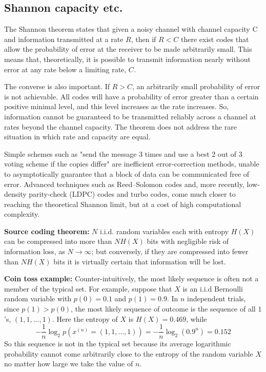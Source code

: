 \documentclass[12pt]{article}
\begin{document}
\subsection{Shannon capacity etc.}
\par The Shannon theorem states that given a noisy channel with channel capacity C and information transmitted at a rate $R$, then if $R<C$ there exist codes that allow the probability of error at the receiver to be made arbitrarily small. This means that, theoretically, it is possible to transmit information nearly without error at any rate below a limiting rate, $C$.
\par The converse is also important. If $R>C$, an arbitrarily small probability of error is not achievable. All codes will have a probability of error greater than a certain positive minimal level, and this level increases as the rate increases. So, information cannot be guaranteed to be transmitted reliably across a channel at rates beyond the channel capacity. The theorem does not address the rare situation in which rate and capacity are equal.
\par Simple schemes such as "send the message 3 times and use a best 2 out of 3 voting scheme if the copies differ" are inefficient error-correction methods, unable to asymptotically guarantee that a block of data can be communicated free of error. Advanced techniques such as Reed–Solomon codes and, more recently, low-density parity-check (LDPC) codes and turbo codes, come much closer to reaching the theoretical Shannon limit, but at a cost of high computational complexity.
\par \textbf{Source coding theorem:} $N$ i.i.d. random variables each with entropy $H(X)$ can be compressed into more than $NH(X)$ bits with negligible risk of information loss, as $N\rightarrow\infty$; but conversely, if they are compressed into fewer than $NH(X)$ bits it is virtually certain that information will be lost.
\par \textbf{Coin toss example:} Counter-intuitively, the most likely sequence is often not a member of the typical set. For example, suppose that $X$ is an i.i.d Bernoulli random variable with $p(0)=0.1$ and $p(1)=0.9$. In $n$ independent trials, since $p(1)>p(0)$, the most likely sequence of outcome is the sequence of all $1$'s, $(1,1,...,1)$. Here the entropy of $X$ is $H(X)=0.469$, while
\[ -\frac{1}{n}\log_2 p\left( x^{(n)}=(1,1,\dots,1) \right)
= -\frac{1}{n}\log_2 (0.9^n) = 0.152 \]
So this sequence is not in the typical set because its average logarithmic probability cannot come arbitrarily close to the entropy of the random variable $X$ no matter how large we take the value of $n$.
\end{document}
